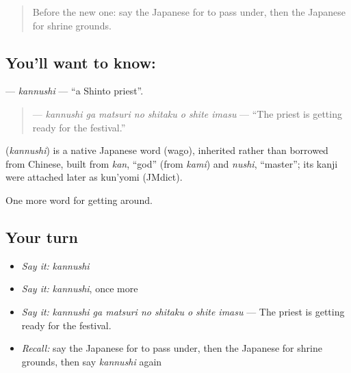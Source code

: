 \label{lesson:JA-C406-kannushi}



\begin{quote}
Before the new one: say the Japanese for to pass under, then the Japanese for shrine grounds.
\end{quote}

\subsection*{You'll want to know: }
\textbf{} — \emph{kannushi} — \textquotedblleft{}a Shinto priest\textquotedblright{}.

\begin{quote}
\textbf{   } — \emph{kannushi ga matsuri no shitaku o shite imasu} — \textquotedblleft{}The priest is getting ready for the festival.\textquotedblright{}
\end{quote}

\begin{cousinweb}
\textbf{} (\emph{kannushi}) is a native Japanese word (wago), inherited rather than borrowed from Chinese, built from \emph{kan}, \textquotedblleft{}god\textquotedblright{} (from \emph{kami}) and \emph{nushi}, \textquotedblleft{}master\textquotedblright{}; its kanji were attached later as kun'yomi (JMdict).
\end{cousinweb}

\begin{grammarlens}[title={What you've built}]
One more word for getting around.
\end{grammarlens}

\subsection*{Your turn}
\begin{itemize}
\raggedright
  \item \emph{Say it:} \emph{kannushi}
  \item \emph{Say it:} \emph{kannushi}, once more
  \item \emph{Say it:} \emph{kannushi ga matsuri no shitaku o shite imasu} — The priest is getting ready for the festival.
  \item \emph{Recall:} say the Japanese for to pass under, then the Japanese for shrine grounds, then say \emph{kannushi} again
\end{itemize}

